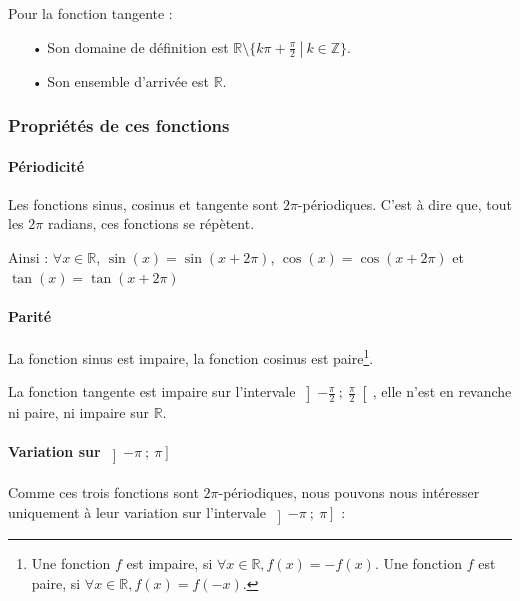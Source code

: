 \documentclass[a4paper]{article}
\begin{document}
					Pour la fonction tangente :
					\begin{itemize}
						\item [•] Son domaine de définition est $\mathbb{R} \setminus \{\left. k\pi+\frac{\pi}{2} ~ \right| ~ k \in \mathbb{Z}\}$.
						\item [•] Son ensemble d'arrivée est $\mathbb{R}$.
					\end{itemize}

			\subsubsection{Propriétés de ces fonctions}
				\paragraph*{Périodicité}
					\phantom{r}

					Les fonctions sinus, cosinus et tangente sont $2\pi$-périodiques.
					C'est à dire que, tout les $2\pi$ radians, ces fonctions se répètent.
					
					Ainsi : $\forall x \in \mathbb{R}$, $\sin(x) = \sin(x + 2\pi)$, $\cos(x) = \cos(x + 2\pi)$ et $\tan(x) = \tan(x + 2\pi)$
				\paragraph*{Parité}
					\phantom{r}

					La fonction sinus est impaire, la fonction cosinus est paire\footnote{
						Une fonction $f$ est impaire, si $\forall x \in \mathbb{R}, f(x) = -f(x)$.
						Une fonction $f$ est paire, si $\forall x \in \mathbb{R}, f(x) = f(-x)$.}.
					
					La fonction tangente est impaire sur l'intervale $\left] -\frac{\pi}{2}~;~\frac{\pi}{2} \right[$, 
					elle n'est en revanche ni paire, ni impaire sur $\mathbb{R}$.

				\paragraph*{Variation sur $\left] -\pi ~;~ \pi\right]$}
					\phantom{r}
					
					Comme ces trois fonctions sont $2\pi$-périodiques,
					nous pouvons nous intéresser uniquement à leur variation sur l'intervale $\left] -\pi ~;~ \pi \right]$ :

					\vspace{3mm}
\end{document}
